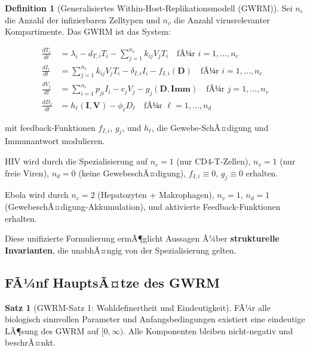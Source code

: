 ﻿\documentclass[a4paper,12pt]{article}
\theoremstyle{definition}
\newtheorem{definition}{Definition}
\newtheorem{satz}{Satz}
\begin{document}
\begin{definition}[Generalisiertes Within-Host-Replikationsmodell (GWRM)]
Sei $n_c$ die Anzahl der infizierbaren Zelltypen und $n_v$ die Anzahl virusrelevanter Kompartimente. Das GWRM ist das System:

\begin{align}
\frac{dT_i}{dt} &= \lambda_i - d_{T,i} T_i - \sum_{j=1}^{n_v} k_{ij} V_j T_i \quad \text{fÃ¼r } i=1,\ldots,n_c \label{eq:gwrm_t}\\
\frac{dI_i}{dt} &= \sum_{j=1}^{n_v} k_{ij} V_j T_i - \delta_{I,i} I_i - f_{I,i}(\mathbf{D}) \quad \text{fÃ¼r } i=1,\ldots,n_c \label{eq:gwrm_i}\\
\frac{dV_j}{dt} &= \sum_{i=1}^{n_c} p_{ji} I_i - c_j V_j - g_j(\mathbf{D}, \mathbf{Imm}) \quad \text{fÃ¼r } j=1,\ldots,n_v \label{eq:gwrm_v}\\
\frac{dD_\ell}{dt} &= h_\ell(\mathbf{I}, \mathbf{V}) - \phi_\ell D_\ell \quad \text{fÃ¼r } \ell = 1, \ldots, n_d \label{eq:gwrm_d}
\end{align}

mit feedback-Funktionen $f_{I,i}$, $g_j$, und $h_\ell$, die Gewebe-SchÃ¤digung und Immunantwort modulieren.

HIV wird durch die Spezialisierung auf $n_c=1$ (nur CD4-T-Zellen), $n_v=1$ (nur freie Viren), $n_d=0$ (keine GewebeschÃ¤digung), $f_{I,i} \equiv 0$, $g_j \equiv 0$ erhalten.

Ebola wird durch $n_c=2$ (Hepatozyten + Makrophagen), $n_v=1$, $n_d=1$ (GewebeschÃ¤digung-Akkumulation), und aktivierte Feedback-Funktionen erhalten.
\end{definition}

Diese unifizierte Formulierung ermÃ¶glicht Aussagen Ã¼ber \textbf{strukturelle Invarianten}, die unabhÃ¤ngig von der Spezialisierung gelten.

\subsection{FÃ¼nf HauptsÃ¤tze des GWRM}

\begin{satz}[GWRM-Satz 1: Wohldefinertheit und Eindeutigkeit]
FÃ¼r alle biologisch sinnvollen Parameter und Anfangsbedingungen existiert eine eindeutige LÃ¶sung des GWRM auf $[0, \infty)$. Alle Komponenten bleiben nicht-negativ und beschrÃ¤nkt.
\end{satz}
\end{document}
